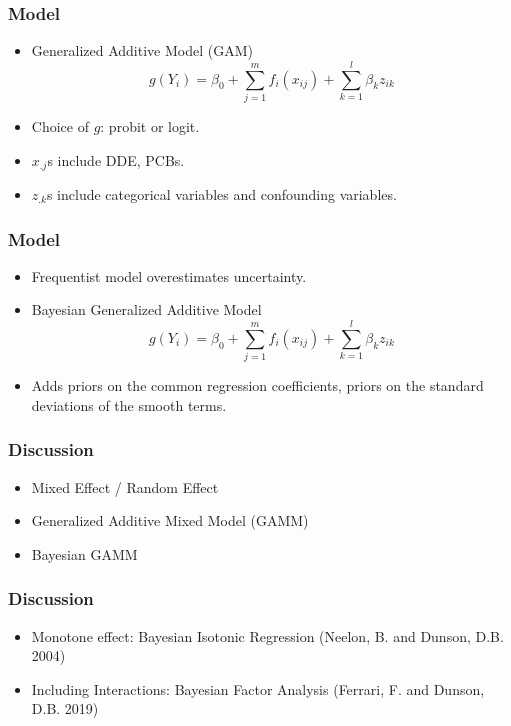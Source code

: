 \documentclass{beamer}
\begin{document}
\begin{frame}
\frametitle{Model}

\begin{itemize}

\item Generalized Additive Model (GAM)
$$g(Y_i) = \beta_0 + \sum_{j=1}^m f_i(x_{ij}) + \sum_{k=1}^l \beta_{k}z_{ik}$$

\item Choice of $g$: probit or logit.
\item $x_{.j}$s include DDE, PCBs.
\item $z_{.k}$s include categorical variables and confounding variables.

\end{itemize}
\end{frame}




\begin{frame}
\frametitle{Model}

\begin{itemize}

\item Frequentist model overestimates uncertainty.
\item Bayesian Generalized Additive Model
$$g(Y_i) = \beta_0 + \sum_{j=1}^m f_i(x_{ij}) + \sum_{k=1}^l \beta_{k}z_{ik}$$

\item Adds priors on the common regression coefficients, priors on the standard deviations of the smooth terms.


\end{itemize}
\end{frame}




\begin{frame}
\frametitle{Discussion}

\begin{itemize}


\item Mixed Effect / Random Effect
\item Generalized Additive Mixed Model (GAMM)
\item Bayesian GAMM 


\end{itemize}
\end{frame}


\begin{frame}
\frametitle{Discussion}

\begin{itemize}


\item Monotone effect: Bayesian Isotonic Regression (Neelon, B. and Dunson, D.B. 2004)
\item Including Interactions: Bayesian Factor Analysis (Ferrari, F. and Dunson, D.B. 2019)



\end{itemize}
\end{frame}
\end{document}
